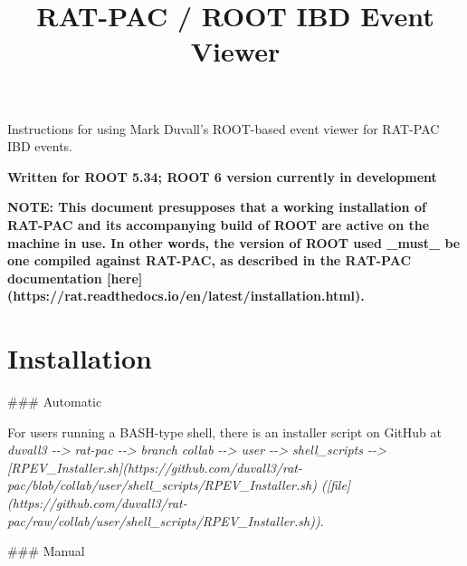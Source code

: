 \documentclass[a4paper]{article}
\begin{document}
\title{RAT-PAC / ROOT IBD Event Viewer%
  \label{rat-pac-root-ibd-event-viewer}}
\author{}
\date{}
\maketitle

Instructions for using Mark Duvall's ROOT-based event viewer for RAT-PAC IBD events.

\textbf{Written for ROOT 5.34; ROOT 6 version currently in development}

\textbf{NOTE: This document presupposes that a working installation of RAT-PAC and its accompanying build of ROOT are active on the machine in use. In other words, the version of ROOT used \_must\_ be one compiled against RAT-PAC, as described in the RAT-PAC documentation {[}here{]}(https://rat.readthedocs.io/en/latest/installation.html).}


\section{Installation%
  \label{installation}%
}

\#\#\# Automatic

For users running a BASH-type shell, there is an installer script on GitHub at \emph{duvall3 -{}-> rat-pac -{}-> branch collab -{}-> user -{}-> shell\_scripts -{}-> {[}RPEV\_Installer.sh{]}(https://github.com/duvall3/rat-pac/blob/collab/user/shell\_scripts/RPEV\_Installer.sh) ({[}file{]}(https://github.com/duvall3/rat-pac/raw/collab/user/shell\_scripts/RPEV\_Installer.sh))}.

\#\#\# Manual
\end{document}
